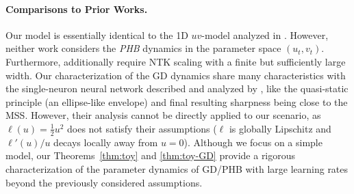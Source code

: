 \paragraph{Comparisons to Prior Works.}
Our model is essentially identical to the 1D $uv$-model analyzed in \citet{kalra2023catapult,lewkowycz2020catapult}.
However, neither work considers the {\it PHB} dynamics in the parameter space $(u_t, v_t)$. Furthermore, \cite{lewkowycz2020catapult} additionally require NTK scaling with a finite but sufficiently large width.
Our characterization of the GD dynamics share many characteristics with the single-neuron neural network described and analyzed by \citet{ahn2022threshold}, like the quasi-static principle (an ellipse-like envelope) and final resulting sharpness being close to the MSS.
However, their analysis cannot be directly applied to our scenario, as $\ell(u) = \frac{1}{2} u^2$ does not satisfy their assumptions ($\ell$ is globally Lipschitz and $\ell'(u) / u$ decays locally away from $u = 0$).
Although we focus on a simple model, our Theorems~\ref{thm:toy} and \ref{thm:toy-GD} provide a rigorous characterization of the parameter dynamics of GD/PHB with large learning rates beyond the previously considered assumptions.




